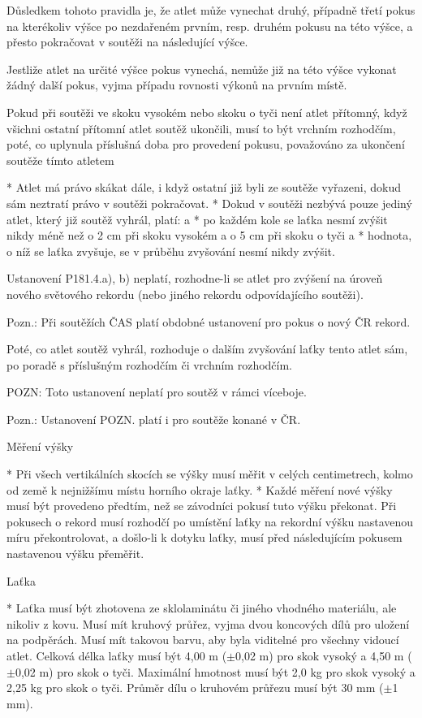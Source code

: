 Důsledkem tohoto pravidla je, že atlet může vynechat druhý, případně třetí pokus na kterékoliv výšce po nezdařeném prvním, resp. druhém pokusu na této výšce, a přesto pokračovat v soutěži na následující výšce.

Jestliže atlet na určité výšce pokus vynechá, nemůže již na této výšce vykonat žádný další pokus, vyjma případu rovnosti výkonů na prvním místě.

Pokud při soutěži ve skoku vysokém nebo skoku o tyči není atlet přítomný, když všichni ostatní přítomní atlet soutěž ukončili, musí to být vrchním rozhodčím, poté, co uplynula příslušná doba pro provedení pokusu, považováno za ukončení soutěže tímto atletem

* Atlet má právo skákat dále, i když ostatní již byli ze soutěže vyřazeni, dokud sám neztratí právo v soutěži pokračovat.
* Dokud v soutěži nezbývá pouze jediný atlet, který již soutěž vyhrál, platí:
  \begitems \style a
  * po každém kole se laťka nesmí zvýšit nikdy méně než o 2 cm při skoku vysokém a o 5 cm při skoku o tyči a
  * hodnota, o níž se laťka zvyšuje, se v průběhu zvyšování nesmí nikdy zvýšit.
  \enditems

Ustanovení P181.4.a), b) neplatí, rozhodne-li se atlet pro zvýšení na úroveň nového světového rekordu (nebo jiného rekordu odpovídajícího soutěži).

Pozn.: Při soutěžích ČAS platí obdobné ustanovení pro pokus o nový ČR rekord.

Poté, co atlet soutěž vyhrál, rozhoduje o dalším zvyšování laťky tento atlet sám, po poradě s příslušným rozhodčím či vrchním rozhodčím.

POZN: Toto ustanovení neplatí pro soutěž v rámci víceboje.

Pozn.: Ustanovení POZN. platí i pro soutěže konané v ČR.

Měření výšky

* Při všech vertikálních skocích se výšky musí měřit v celých centimetrech, kolmo od země k nejnižšímu místu horního okraje laťky.
* Každé měření nové výšky musí být provedeno předtím, než se závodníci pokusí tuto výšku překonat. Při pokusech o rekord musí rozhodčí po umístění laťky na rekordní výšku nastavenou míru překontrolovat, a došlo-li k dotyku laťky, musí před následujícím pokusem nastavenou výšku přeměřit.

Laťka

* Laťka musí být zhotovena ze sklolaminátu či jiného vhodného materiálu, ale nikoliv z kovu. Musí mít kruhový průřez, vyjma dvou koncových dílů pro uložení na podpěrách. Musí mít takovou barvu, aby byla viditelné pro všechny vidoucí atlet. Celková délka laťky musí být 4,00 m ($\pm$0,02 m) pro skok vysoký a 4,50 m ($\pm$0,02 m) pro skok o tyči. Maximální hmotnost musí být 2,0 kg pro skok vysoký a 2,25 kg pro skok o tyči. Průměr dílu o kruhovém průřezu musí být 30 mm ($\pm$1 mm).

